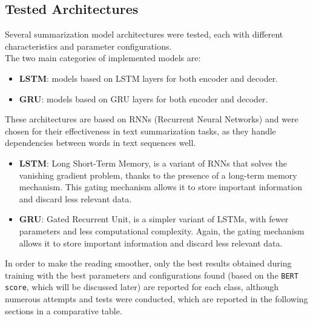 \subsection{Tested Architectures}
Several summarization model architectures were tested, each with different characteristics and parameter configurations.\\
The two main categories of implemented models are:
\begin{itemize}
    \item \textbf{LSTM}: models based on LSTM layers for both encoder and decoder.
    \item \textbf{GRU}: models based on GRU layers for both encoder and decoder.
\end{itemize}
These architectures are based on RNNs (Recurrent Neural Networks) and were chosen for their effectiveness in text summarization tasks, as they handle dependencies between words in text sequences well.\\
\begin{itemize}
    \item \textbf{LSTM}: Long Short-Term Memory, is a variant of RNNs that solves the vanishing gradient problem, thanks to the presence of a long-term memory mechanism.
          This gating mechanism allows it to store important information and discard less relevant data.
    \item \textbf{GRU}: Gated Recurrent Unit, is a simpler variant of LSTMs, with fewer parameters and less computational complexity.
          Again, the gating mechanism allows it to store important information and discard less relevant data.
\end{itemize}

In order to make the reading smoother, only the best results obtained during training with the best parameters and configurations found (based on the \texttt{BERT score}, which will be discussed later) are reported for each class, although numerous attempts and tests were conducted, which are reported in the following sections in a comparative table.\\





%
